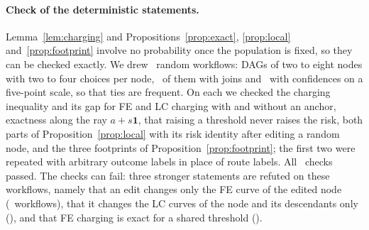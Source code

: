 \paragraph{Check of the deterministic statements.} Lemma~\ref{lem:charging} and
Propositions~\ref{prop:exact}, \ref{prop:local} and~\ref{prop:footprint} involve no
probability once the population is fixed, so they can be checked exactly. We drew
\ClaimsWorkflows\ random workflows: DAGs of two to eight nodes with two to four choices per
node, \ClaimsJoins\ of them with joins and \ClaimsTies\ with confidences on a five-point
scale, so that ties are frequent. On each we checked the charging inequality and its gap
for FE and LC charging with and without an anchor, exactness along the ray
$a+s\mathbf 1$, that raising a threshold never raises the risk, both parts of
Proposition~\ref{prop:local} with its risk identity after editing a random node, and the
three footprints of Proposition~\ref{prop:footprint}; the first two were repeated with
arbitrary outcome labels in place of route labels. All \ClaimsChecks\ checks passed. The
checks can fail: three stronger statements are refuted on these workflows, namely that an
edit changes only the FE curve of the edited node (\ClaimsRefutedFEnode\ workflows), that it
changes the LC curves of the node and its descendants only (\ClaimsRefutedLCdesc), and that
FE charging is exact for a shared threshold (\ClaimsRefutedFEexact).

\begin{table}[!htb]
\centering\footnotesize
\setlength{\tabcolsep}{3.5pt}

\caption{MASSIVE, $n=8{,}000$, $\delta=0.1$, \Trials\ trials. Columns as in
Table~\ref{tab:main}.}\label{tab:main-massive}
\end{table}

\begin{table}[!htb]
\centering\footnotesize
\setlength{\tabcolsep}{3.5pt}

\caption{LLM-2 (\texttt{\LlmModel} at every node, in-scope traffic), $n=4{,}000$, $\delta=0.1$,
\Trials\ trials, grid with the extended tail. Columns as in Table~\ref{tab:main}. No finite
shared threshold reaches $\eps=2\%$; with one threshold per level only escalating every run
does.}\label{tab:main-llm}
\end{table}

\begin{table}[!htb]
\centering\footnotesize
\setlength{\tabcolsep}{3.5pt}

\caption{LLM-3-FS (\texttt{\LlmModel} with in-context examples at every node, all traffic),
$n=4{,}000$, $\delta=0.1$, \Trials\ trials, grid with the extended tail. Columns as in
Table~\ref{tab:main}.}\label{tab:main-llm-fs}
\end{table}

